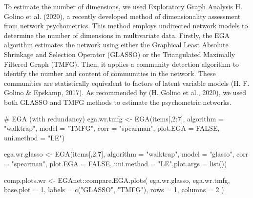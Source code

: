 \documentclass[
  letterpaper,
  DIV=11,
  numbers=noendperiod]{scrreprt}
\newenvironment{Shaded}{\begin{snugshade}}{\end{snugshade}}
\newcommand{\AttributeTok}[1]{\textcolor[rgb]{0.40,0.45,0.13}{#1}}
\newcommand{\CommentTok}[1]{\textcolor[rgb]{0.37,0.37,0.37}{#1}}
\newcommand{\ConstantTok}[1]{\textcolor[rgb]{0.56,0.35,0.01}{#1}}
\newcommand{\DecValTok}[1]{\textcolor[rgb]{0.68,0.00,0.00}{#1}}
\newcommand{\FunctionTok}[1]{\textcolor[rgb]{0.28,0.35,0.67}{#1}}
\newcommand{\NormalTok}[1]{\textcolor[rgb]{0.00,0.23,0.31}{#1}}
\newcommand{\OtherTok}[1]{\textcolor[rgb]{0.00,0.23,0.31}{#1}}
\newcommand{\SpecialCharTok}[1]{\textcolor[rgb]{0.37,0.37,0.37}{#1}}
\newcommand{\StringTok}[1]{\textcolor[rgb]{0.13,0.47,0.30}{#1}}
\begin{document}
To estimate the number of dimensions, we used Exploratory Graph Analysis
H. Golino et al. (2020), a recently developed method of dimensionality
assessment from network psychometrics. This method employs undirected
network models to determine the number of dimensions in multivariate
data. Firstly, the EGA algorithm estimates the network using either the
Graphical Least Absolute Shrinkage and Selection Operator (GLASSO) or
the Triangulated Maximally Filtered Graph (TMFG). Then, it applies a
community detection algorithm to identify the number and content of
communities in the network. These communities are statistically
equivalent to factors of latent variable models (H. F. Golino \&
Epskamp, 2017). As recommended by (H. Golino et al., 2020), we used both
GLASSO and TMFG methods to estimate the psychometric networks.

\begin{Shaded}
\begin{Highlighting}[]
\CommentTok{\# EGA (with redundancy) }
\NormalTok{ega.wr.tmfg }\OtherTok{\textless{}{-}} \FunctionTok{EGA}\NormalTok{(items[,}\DecValTok{2}\SpecialCharTok{:}\DecValTok{7}\NormalTok{], }\AttributeTok{algorithm =} \StringTok{"walktrap"}\NormalTok{, }\AttributeTok{model =} \StringTok{"TMFG"}\NormalTok{,  }\AttributeTok{corr =}  \StringTok{"spearman"}\NormalTok{,}
              \AttributeTok{plot.EGA =} \ConstantTok{FALSE}\NormalTok{, }\AttributeTok{uni.method =} \StringTok{"LE"}\NormalTok{) }

\NormalTok{ega.wr.glasso }\OtherTok{\textless{}{-}} \FunctionTok{EGA}\NormalTok{(items[,}\DecValTok{2}\SpecialCharTok{:}\DecValTok{7}\NormalTok{], }\AttributeTok{algorithm =} \StringTok{"walktrap"}\NormalTok{, }\AttributeTok{model =} \StringTok{"glasso"}\NormalTok{, }\AttributeTok{corr =}  \StringTok{"spearman"}\NormalTok{,}
              \AttributeTok{plot.EGA =} \ConstantTok{FALSE}\NormalTok{, }\AttributeTok{uni.method =} \StringTok{"LE"}\NormalTok{,}\AttributeTok{plot.args =} \FunctionTok{list}\NormalTok{()) }


\NormalTok{comp.plots.wr }\OtherTok{\textless{}{-}}\NormalTok{ EGAnet}\SpecialCharTok{::}\FunctionTok{compare.EGA.plots}\NormalTok{(}
\NormalTok{  ega.wr.glasso, ega.wr.tmfg,}
  \AttributeTok{base.plot =} \DecValTok{1}\NormalTok{,}
  \AttributeTok{labels =} \FunctionTok{c}\NormalTok{(}\StringTok{"GLASSO"}\NormalTok{, }\StringTok{"TMFG"}\NormalTok{),}
  \AttributeTok{rows =} \DecValTok{1}\NormalTok{, }\AttributeTok{columns =} \DecValTok{2}
\NormalTok{)}
\end{Highlighting}
\end{Shaded}
\end{document}
